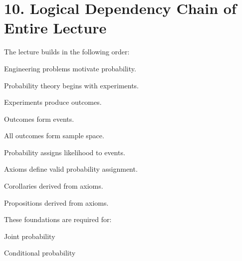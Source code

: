 \documentclass[12pt]{article}
\begin{document}
\section*{10. Logical Dependency Chain of Entire Lecture}

The lecture builds in the following order:

Engineering problems motivate probability.

Probability theory begins with experiments.

Experiments produce outcomes.

Outcomes form events.

All outcomes form sample space.

Probability assigns likelihood to events.

Axioms define valid probability assignment.

Corollaries derived from axioms.

Propositions derived from axioms.

These foundations are required for:

Joint probability

Conditional probability
\end{document}
